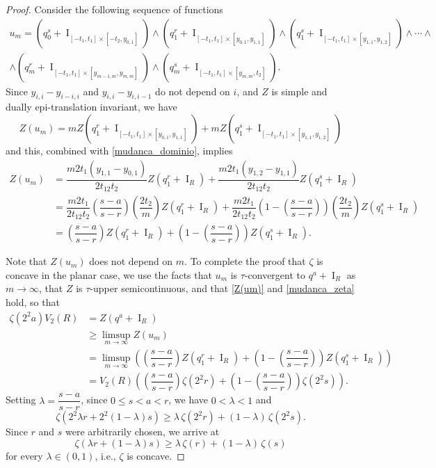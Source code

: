 \documentclass[11pt]{article}
\theoremstyle{definition} %
\DeclareMathOperator{\I}{I}
\begin{document}
\begin{proof}
Consider the following sequence of functions
\begin{multline*}
u_m= (q_0^s+\I_{[-t_1,t_1]\times [-t_2, y_{0,1}]})\wedge (q_1^r+\I_{[-t_1,t_1]\times [ y_{0,1}, y_{1,1}]})\wedge (q_1^s+\I_{[-t_1,t_1]\times [ y_{1,1}, y_{1,2}]})\wedge\cdots\wedge\\
\wedge (q_m^r+\I_{[-t_1,t_1]\times [ y_{m-1,m}, y_{m,m}]})\wedge (q_m^s+\I_{[-t_1,t_1]\times [ y_{m,m}, t_2]}).
\end{multline*}
Since $y_{i,i}-y_{i-i,i}$ and $y_{i,i}-y_{i,i-1}$ do not depend on $i$, and $Z$ is  simple  and dually epi-translation invariant, we have
$$Z(u_m)=m Z(q_1^r+\I_{[-t_1,t_1]\times [ y_{0,1}, y_{1,1}]}) + mZ(q_1^s+\I_{[-t_1,t_1]\times [ y_{1,1}, y_{1,2}]})$$
and  this, combined with \eqref{mudanca_dominio}, implies
\begin{align}
\nonumber  Z(u_m)  &= \dfrac{m2t_1(y_{1,1}-y_{0,1})}{2t_12t_2}Z(q_1^r+\I_R)   + \dfrac{m2t_1(y_{1,2}-y_{1,1})}{2t_12t_2}Z(q_1^s+\I_R)\\
 \nonumber & =\dfrac{m2t_1}{2t_12t_2}\left(\dfrac{s-a}{s-r}\right)\left(\dfrac{2t_2}{m}\right)Z(q_1^r+\I_R) + \dfrac{m2t_1}{2t_12t_2}\left(1-\left(\dfrac{s-a}{s-r}\right)\right)\left(\dfrac{2t_2}{m}\right)Z(q_1^s+\I_R)\\
&  =\left(\dfrac{s-a}{s-r}\right)Z(q_1^r+\I_R)+ \left(1-\left(\dfrac{s-a}{s-r}\right)\right)Z(q_1^s+\I_R). \label{Z(um)}
\end{align}



Note that $Z(u_m)$ does not depend on $m$. To complete the proof that $\zeta$ is concave in the planar case, we use the facts that $u_m$ is $\tau$-convergent to $q^a+\I_R$ as $m\rightarrow \infty$, that $Z$ is $\tau$-upper semicontinuous, and that \eqref{Z(um)}  and \eqref{mudanca_zeta} hold,  so that
\begin{align*}
    \zeta(2^2a)V_2(R)&=Z(q^a+\I_R)\\
    & \geq \limsup_{m\rightarrow \infty} Z(u_m)\\
    &= \limsup_{m\rightarrow \infty} \left(\left(\dfrac{s-a}{s-r}\right)Z(q_1^r+\I_R)+ \left(1-\left(\dfrac{s-a}{s-r}\right)\right)Z(q_1^s+\I_R)\right)\\
    &=V_2(R)\left(\left(\dfrac{s-a}{s-r}\right) \zeta(2^2r)+ \left(1-\left(\dfrac{s-a}{s-r}\right)\right)\zeta(2^2s)\right).
\end{align*}
Setting $\lambda= \dfrac{s-a}{s-r}$, since $0\leq s<a<r$, we have  $0<\lambda<1$ and 
$$\zeta(2^2\lambda r+2^2(1-\lambda)s)\geq \lambda \,\zeta(2^2r)+(1-\lambda)\,\zeta(2^2s).$$
Since $r$ and $s$ were arbitrarily chosen, we arrive at
$$\zeta(\lambda r+(1-\lambda)s)\geq \lambda\, \zeta(r)+(1-\lambda)\,\zeta(s)$$
for every $\lambda\in (0,1)$, i.e., $\zeta$ is concave.
\medskip




\end{proof}
\end{document}
